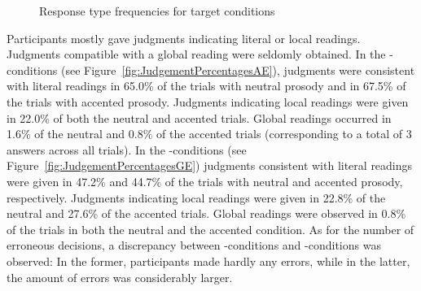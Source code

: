 \documentclass[fleqn,reqno,10pt,draft]{article}
\newcommand{\as}{\acro{as}}
\renewcommand{\es}{\acro{es}}
\begin{document}
\begin{figure}[]
{

\label{fig:JudgementPercentagesGE}
}
\caption[Optional caption for list of figures]{Response type
  frequencies for target conditions}
\label{fig:JudgementPercentages}
\end{figure}
%
Participants mostly gave judgments indicating literal or local
readings. Judgments compatible with a global reading were seldomly
obtained. In the \as-conditions (see Figure~\ref{fig:JudgementPercentagesAE}),
judgments were consistent with literal readings in 65.0\% of the
trials with neutral prosody and in 67.5\% of the trials with accented
prosody. Judgments indicating local readings were given 
  in 22.0\% of both the neutral and accented trials. Global readings 
occurred in 1.6\% of the neutral and 0.8\% of the accented trials
(corresponding to a total of 3 answers across all trials).  
In the \es-conditions (see Figure~\ref{fig:JudgementPercentagesGE}) 
judgments consistent with literal readings were given in 47.2\% and 
44.7\% of the trials with neutral and accented prosody, respectively. 
Judgments indicating local readings were given in 22.8\% of
the neutral and 27.6\% of the accented trials. Global readings were
observed in 0.8\% of the trials in both the neutral and the accented
condition. 
As for the number of erroneous decisions, a discrepancy between 
\as-conditions and \es-conditions was observed: In the former, 
participants made hardly any errors, while in the latter, the amount 
of errors was considerably larger.
\end{document}
